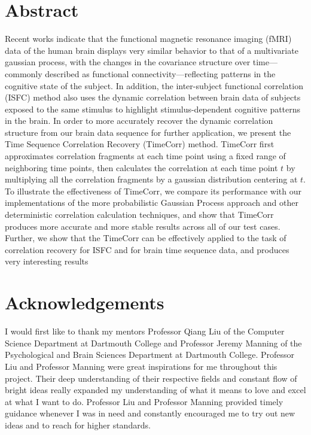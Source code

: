 \documentclass[12pt]{article}
\begin{document}
\section{Abstract}
Recent works indicate that the functional magnetic resonance imaging (fMRI) data of the human brain displays very similar behavior to that of a multivariate gaussian process, with the changes in the covariance structure over time---commonly described as functional connectivity---reflecting patterns in the cognitive state of the subject. In addition, the inter-subject functional correlation (ISFC) method also uses the dynamic correlation between brain data of subjects exposed to the same stimulus to highlight stimulus-dependent cognitive patterns in the brain. In order to more accurately recover the dynamic correlation structure from our brain data sequence for further application, we present the Time Sequence Correlation Recovery (TimeCorr) method. TimeCorr first approximates correlation fragments at each time point using a fixed range of neighboring time points, then calculates the correlation at each time point $t$ by multiplying all the correlation fragments by a gaussian distribution centering at $t$. To illustrate the effectiveness of TimeCorr, we compare its performance with our implementations of the more probabilistic Gaussian Process approach and other deterministic correlation calculation techniques, and show that TimeCorr produces more accurate and more stable results across all of our test cases. Further, we show that the TimeCorr can be effectively applied to the task of correlation recovery for ISFC and for brain time sequence data, and produces very interesting results 
\newpage
\section{Acknowledgements}
I would first like to thank my mentors Professor Qiang Liu of the Computer Science Department at Dartmouth College and Professor Jeremy Manning of the Psychological and Brain Sciences Department at Dartmouth College. Professor Liu and Professor Manning were great inspirations for me throughout this project. Their deep understanding of their respective fields and constant flow of bright ideas really expanded my understanding of what it means to love and excel at what I want to do. Professor Liu and Professor Manning provided timely guidance whenever I was in need and constantly encouraged me to try out new ideas and to reach for higher standards. \par
\end{document}
